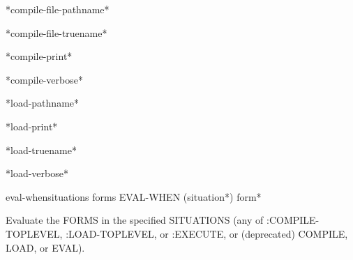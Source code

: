 \documentclass[10pt,english]{book}
\begin{document}
\begin{variable}{*compile-file-pathname*}{}
  
\end{variable}

\begin{variable}{*compile-file-truename*}{}
  
\end{variable}

\begin{variable}{*compile-print*}{}
  
\end{variable}

\begin{variable}{*compile-verbose*}{}
  
\end{variable}

\begin{variable}{*load-pathname*}{}
  
\end{variable}

\begin{variable}{*load-print*}{}
  
\end{variable}

\begin{variable}{*load-truename*}{}
  
\end{variable}

\begin{variable}{*load-verbose*}{}
  
\end{variable}

\begin{specialop}{eval-when}{situations \rest forms}
  EVAL-WHEN (situation*) form*

Evaluate the FORMS in the specified SITUATIONS (any of :COMPILE-TOPLEVEL,
:LOAD-TOPLEVEL, or :EXECUTE, or (deprecated) COMPILE, LOAD, or EVAL).
\end{specialop}
\end{document}
